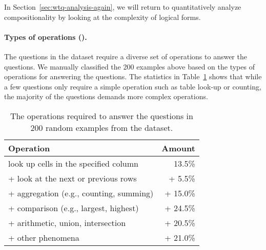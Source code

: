 In Section~\ref{sec:wtq-analysis-again},
we will return to quantitatively analyze
compositionality
by looking at the complexity of logical forms.

\paragraph{Types of operations (\Depth).}

The questions in the \wtq dataset require
a diverse set of operations to answer the questions.
We manually classified the 200 examples above
based on the types of operations
for answering the questions.
The statistics in Table~\ref{tab:wtq-operations}
shows that while a few questions only require
a simple operation such as table look-up or counting,
the majority of the questions
demands more complex operations.

\begin{table}[t]
\centering
\begin{tabular}{lr} \toprule
\textbf{Operation} & \textbf{Amount} \\ \midrule
look up cells in the specified column & 13.5\% \\
+ look at the next or previous rows & + 5.5\% \\
+ aggregation (e.g., counting, summing) & + 15.0\% \\
+ comparison (e.g., largest, highest) & + 24.5\% \\
+ arithmetic, union, intersection & + 20.5\% \\
+ other phenomena & + 21.0\% \\ \bottomrule
\end{tabular}
\caption[Operations required to answer questions in the \wtq dataset]{
The operations required to answer the questions
in 200 random examples from the \wtq dataset.}
\label{tab:wtq-operations}
\end{table}


